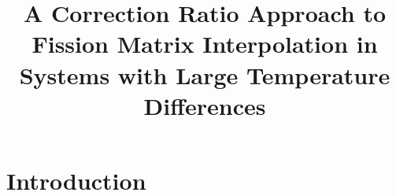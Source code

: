 \documentclass[letterpaper]{physor2026}
\title{A Correction Ratio Approach to Fission Matrix Interpolation in Systems with Large Temperature Differences}
\begin{document}
\section{Introduction}\label{sec:1}



\end{document}
